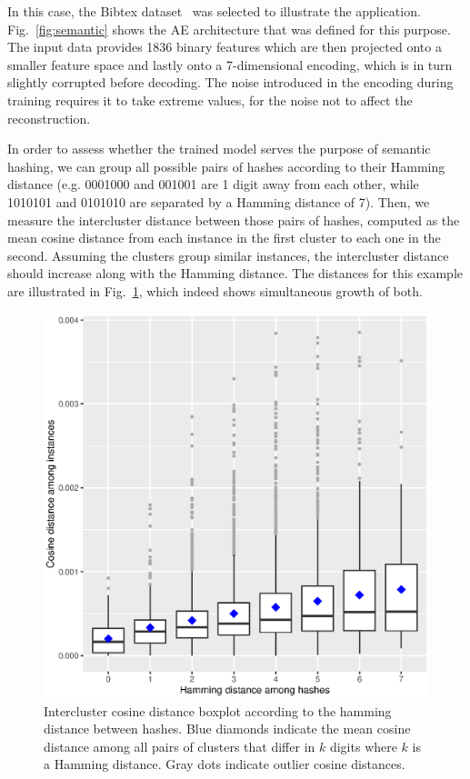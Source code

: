 \documentclass[
	fontsize=11pt, %
	twoside=false, %
	open=any, %
	secnumdepth=1, %
]{kaobook}
\begin{document}
In this case, the Bibtex dataset~\cite{bibtex} was selected to illustrate the application. Fig.~\ref{fig:semantic} shows the AE architecture that was defined for this purpose. The input data provides 1836 binary features which are then projected onto a smaller feature space and lastly onto a 7-dimensional encoding, which is in turn slightly corrupted before decoding. The noise introduced in the encoding during training requires it to take extreme values, for the noise not to affect the reconstruction.

In order to assess whether the trained model serves the purpose of semantic hashing, we can group all possible pairs of hashes according to their Hamming distance (e.g. 0001000 and 001001 are 1 digit away from each other, while 1010101 and 0101010 are separated by a Hamming distance of 7). Then, we measure the intercluster distance between those pairs of hashes, computed as the mean cosine distance from each instance in the first cluster to each one in the second. Assuming the clusters group similar instances, the intercluster distance should increase along with the Hamming distance. The distances for this example are illustrated in Fig.~\ref{fig:hashingplot}, which indeed shows simultaneous growth of both.

\begin{figure}[ht!]
    \centering
    \includegraphics[width=\linewidth]{hashing_intercluster.eps}
    \caption{\label{fig:hashingplot}Intercluster cosine distance boxplot according to the hamming distance between hashes. Blue diamonds indicate the mean cosine distance among all pairs of clusters that differ in $k$ digits where $k$ is a Hamming distance. Gray dots indicate outlier cosine distances.}
\end{figure}
\end{document}
